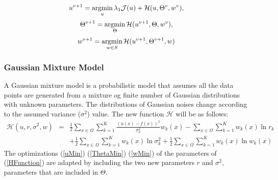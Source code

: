 \begin{equation}\label{uMin}
    u^{v+1} = \operatorname*{argmin}_u \lambda_1\mathcal{J}(u)+\mathcal{H}(u,\Theta^v,w^v),
\end{equation}
\begin{equation}\label{ThetaMin}
    \Theta^{v+1} = \operatorname*{argmin}_\Theta \mathcal{H}(u^{v+1}, \Theta, w^v),
\end{equation}
\begin{equation}\label{wMin}
    w^{v+1} = \operatorname*{argmin}_{w\in{S}} \mathcal{H}(u^{v+1}, \Theta^{v+1},w)
\end{equation}

\subsubsection{Gaussian Mixture Model}
A Gaussian mixture model is a probabilistic model that assumes all the data 
points are generated from a mixture og finite number of Gaussian distributions 
with unknown parameters. The distributions of Gaussian noises change 
according to the assumed variance ($\sigma^2$) value. The new function $ \mathcal{H} $ will be 
as follows:
\begin{eqnarray}
    \mathcal{H}(u,r,\sigma^2,w) & = & \frac{1}{2}\sum_{x\in\Omega}\sum_{k=1}^K\frac{(u(x)-f(x))^2}{\sigma^2_k}w_k(x)-\sum_{x\in\Omega}\sum_{k=1}^Kw_k(x)\ln{r_k}\nonumber \\
                                &   & + \frac{1}{2}\sum_{x\in\Omega}\sum_{k=1}^Kw_k(x)\ln{\sigma^2_k}+\frac{1}{2}\sum_{x\in\Omega}\sum_{k=1}^Kw_k(x)\ln{w_k}(x)
\end{eqnarray}
The optimizations (\ref{uMin}) (\ref{ThetaMin}) (\ref{wMin}) of the parameters of (\ref{HFunction}) are adapted by 
including the two new parameters $r$ and $\sigma^2$, parameters that are included in 
$\Theta$.